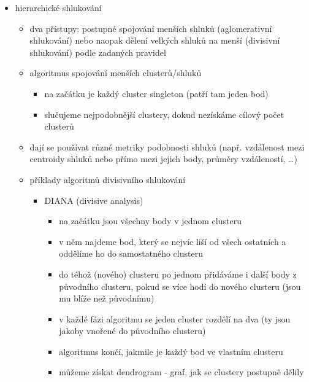 \begin{itemize}
\begin{itemize}
\begin{itemize}
\item kde $z_{i,k}$ je indikátor přiřazení bodu $x_i$ do clusteru $k$
\end{itemize}
\item konvergence
\begin{itemize}
\item aktualizace přiřazení bodů ke clusterům nezvyšuje loss
\item aktualizace středů clusterů nezvyšuje loss
\item takže $K$-means konverguje k lokálnímu optimu
\end{itemize}
\end{itemize}
\item hierarchické shlukování
\begin{itemize}
\item dva přístupy: postupné spojování menších shluků (aglomerativní shlukování) nebo naopak dělení velkých shluků na menší (divisivní shlukování) podle zadaných pravidel
\item algoritmus spojování menších clusterů/shluků
\begin{itemize}
\item na začátku je každý cluster singleton (patří tam jeden bod)
\item slučujeme nejpodobnější clustery, dokud nezískáme cílový počet clusterů
\end{itemize}
\item dají se používat různé metriky podobnosti shluků (např. vzdálenost mezi centroidy shluků nebo přímo mezi jejich body, průměry vzdáleností, \dots{})
\item příklady algoritmů divisivního shlukování
\begin{itemize}
\item DIANA (divisive analysis)
\begin{itemize}
\item na začátku jsou všechny body v jednom clusteru
\item v něm najdeme bod, který se nejvíc liší od všech ostatních a oddělíme ho do samostatného clusteru
\item do téhož (nového) clusteru po jednom přidáváme i další body z původního clusteru, pokud se více hodí do nového clusteru (jsou mu blíže než původnímu)
\item v každé fázi algoritmu se jeden cluster rozdělí na dva (ty jsou jakoby vnořené do původního clusteru)
\item algoritmus končí, jakmile je každý bod ve vlastním clusteru
\item můžeme získat dendrogram - graf, jak se clustery postupně dělily

\end{itemize}
\end{itemize}
\end{itemize}
\end{itemize}

